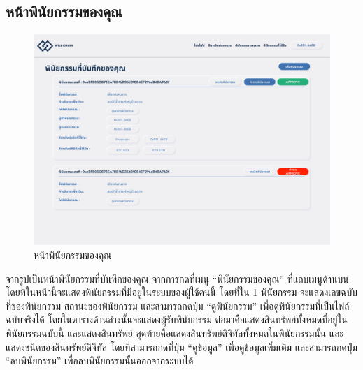 \documentclass[12pt,oneside,openright,a4paper]{cpe-thai-project}
\begin{document}
\subsection{หน้าพินัยกรรมของคุณ}
		\begin{figure}[!thb]
			\centering
			\includegraphics[scale=0.2]{userWill}
			\caption{หน้าพินัยกรรมของคุณ}
		\end{figure}
		\FloatBarrier
		\tab จากรูปเป็นหน้าพินัยกรรมที่บันทึกของคุณ จากการกดที่เมนู “พินัยกรรมของคุณ” ที่แถบเมนูด้านบน โดยที่ในหน้านี้จะแสดงพินัยกรรมที่มีอยู่ในระบบของผู้ใช้คนนี้ โดยที่ใน 1 พินัยกรรม จะแสดงเลขฉบับที่ของพินัยกรรม สถานะของพินัยกรรม และสามารถกดปุ่ม “ดูพินัยกรรม” เพื่อดูพินัยกรรมที่เป็นไฟล์ฉบับจริงได้ โดยในตารางด้านล่างนั้นจะแสดงผู้รับพินัยกรรม ต่อมาคือแสดงสินทรัพย์ทั้งหมดที่อยู่ในพินัยกรรมฉบับนี้ และแสดงสินทรัพย์ สุดท้ายคือแสดงสินทรัพย์ดิจิทัลทั้งหมดในพินัยกรรมนั้น และแสดงชนิดของสินทรัพย์ดิจิทัล โดยที่สามารถกดที่ปุ่ม “ดูข้อมูล” เพื่อดูข้อมูลเพิ่มเติม และสามารถกดปุ่ม “ลบพินัยกรรม” เพื่อลบพินัยกรรมนั้นออกจากระบบได้
\end{document}
